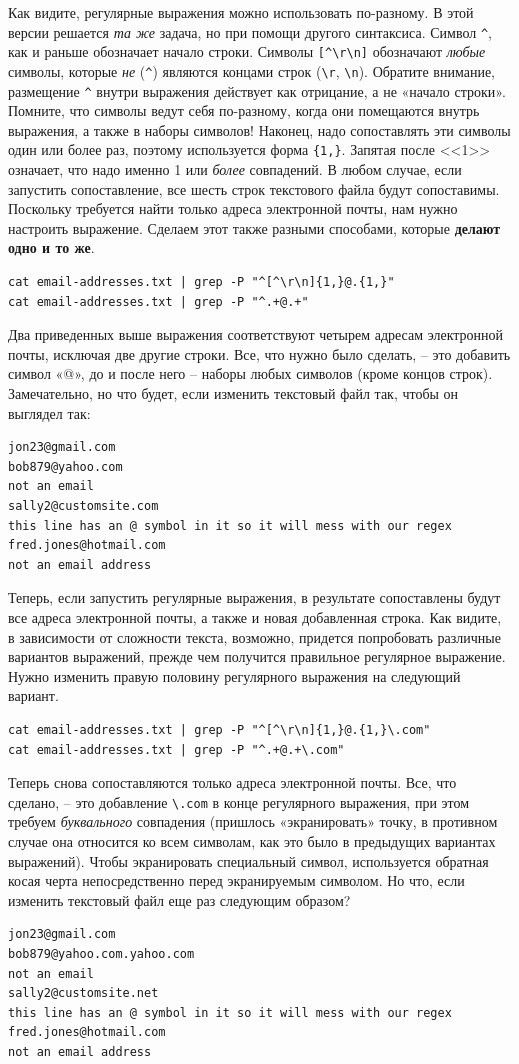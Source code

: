\documentclass[a4paper,12pt,final,openany]{extbook}
\begin{document}
Как видите, регулярные выражения можно использовать по-разному. В этой
версии решается \emph{та же} задача, но при помощи другого синтаксиса.
Символ \texttt{\^{}}, как и раньше обозначает начало строки. Символы
\texttt{{[}\^{}\textbackslash{}r\textbackslash{}n{]}} обозначают
\emph{любые} символы, которые \emph{не} (\texttt{\^{}}) являются концами
строк (\texttt{\textbackslash{}r}, \texttt{\textbackslash{}n}). Обратите
внимание, размещение \texttt{\^{}} внутри выражения действует как
отрицание, а не «начало строки». Помните, что символы ведут себя
по-разному, когда они помещаются внутрь выражения, а также в наборы
символов! Наконец, надо сопоставлять эти символы один или более раз,
поэтому используется форма \texttt{\{1,\}}. Запятая после <<1>> означает,
что надо именно 1 или \emph{более} совпадений. В любом случае, если
запустить сопоставление, все шесть строк текстового файла будут
сопоставимы. Поскольку требуется найти только адреса электронной почты,
нам нужно настроить выражение. Сделаем этот также разными способами,
которые \textbf{делают одно и то же}.
\begin{verbatim}
cat email-addresses.txt | grep -P "^[^\r\n]{1,}@.{1,}"
cat email-addresses.txt | grep -P "^.+@.+"
\end{verbatim}
Два приведенных выше выражения соответствуют четырем адресам электронной
почты, исключая две другие строки. Все, что нужно было сделать, -- это
добавить символ «@», до и после него -- наборы любых символов (кроме
концов строк). Замечательно, но что будет, если изменить текстовый файл
так, чтобы он выглядел так:
\begin{verbatim}
jon23@gmail.com
bob879@yahoo.com
not an email
sally2@customsite.com
this line has an @ symbol in it so it will mess with our regex
fred.jones@hotmail.com
not an email address
\end{verbatim}
Теперь, если запустить регулярные выражения, в результате сопоставлены
будут все адреса электронной почты, а также и новая добавленная строка.
Как видите, в зависимости от сложности текста, возможно, придется
попробовать различные вариантов выражений, прежде чем получится правильное
регулярное выражение. Нужно изменить правую половину регулярного
выражения на следующий вариант.
\begin{verbatim}
cat email-addresses.txt | grep -P "^[^\r\n]{1,}@.{1,}\.com"
cat email-addresses.txt | grep -P "^.+@.+\.com"
\end{verbatim}

Теперь снова сопоставляются только адреса электронной почты. Все, что
сделано, -- это добавление \verb|\.com| в конце
регулярного выражения, при этом требуем \emph{буквального}
совпадения (пришлось «экранировать» точку, в противном случае
она относится ко всем символам, как это было в предыдущих вариантах
выражений). Чтобы экранировать специальный символ, используется обратная
косая черта непосредственно перед экранируемым символом. Но что, если
изменить текстовый файл еще раз следующим образом?
\begin{verbatim}
jon23@gmail.com
bob879@yahoo.com.yahoo.com
not an email
sally2@customsite.net
this line has an @ symbol in it so it will mess with our regex
fred.jones@hotmail.com
not an email address
\end{verbatim}
\end{document}

